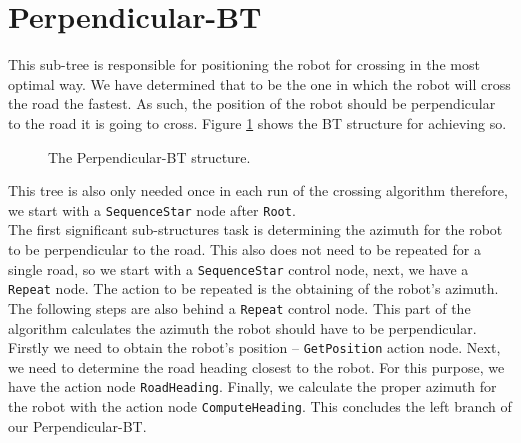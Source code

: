 \section{Perpendicular-BT}
    This sub-tree is responsible for positioning the robot for crossing in the most optimal way. We have determined that to be the one in which the robot will cross the road the fastest. As such, the position of the robot should be perpendicular to the road it is going to cross. Figure \ref{fig:Perpendicular-BT} shows the BT structure for achieving so.
    \begin{figure}[H]
        \caption{The Perpendicular-BT structure.}
        \label{fig:Perpendicular-BT}
    \end{figure}
    \noindent This tree is also only needed once in each run of the crossing algorithm therefore, we start with a \texttt{SequenceStar} node after \texttt{Root}.\\
    The first significant sub-structures task is determining the azimuth for the robot to be perpendicular to the road. This also does not need to be repeated for a single road, so we start with a \texttt{SequenceStar} control node, next, we have a \texttt{Repeat} node. The action to be repeated is the obtaining of the robot's azimuth. The following steps are also behind a \texttt{Repeat} control node. This part of the algorithm calculates the azimuth the robot should have to be perpendicular. Firstly we need to obtain the robot's position -- \texttt{GetPosition} action node. Next, we need to determine the road heading closest to the robot. For this purpose, we have the action node \texttt{RoadHeading}. Finally, we calculate the proper azimuth for the robot with the action node \texttt{ComputeHeading}. This concludes the left branch of our Perpendicular-BT.\\
